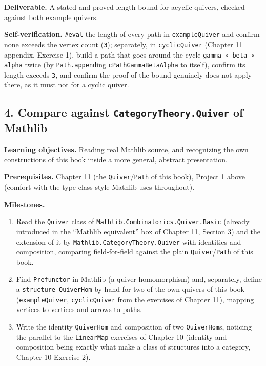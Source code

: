 \textbf{Deliverable.} A stated and proved length bound for acyclic quivers, checked against both example quivers.

\textbf{Self-verification.} \texttt{\#eval} the length of every path in \texttt{exampleQuiver} and confirm none exceeds the vertex count (\texttt{3}); separately, in \texttt{cyclicQuiver} (Chapter 11 appendix, Exercise 1), build a path that goes around the cycle \texttt{gamma ∘ beta ∘ alpha} twice (by \texttt{Path.append}ing \texttt{cPathGammaBetaAlpha} to itself), confirm its length exceeds \texttt{3}, and confirm the proof of the bound genuinely does not apply there, as it must not for a cyclic quiver.

\subsection{\texorpdfstring{4. Compare against \texttt{CategoryTheory.Quiver} of Mathlib}{4. Compare against CategoryTheory.Quiver of Mathlib}}\label{sec:13-next-steps:03-next-projects:5}

\textbf{Learning objectives.} Reading real Mathlib source, and recognizing the own constructions of this book inside a more general, abstract presentation.

\textbf{Prerequisites.} Chapter 11 (the \texttt{Quiver}/\texttt{Path} of this book), Project 1 above (comfort with the type-class style Mathlib uses throughout).

\textbf{Milestones.}

\begin{enumerate}
\def\labelenumi{\arabic{enumi}.}
\tightlist
\item
  Read the \texttt{Quiver} class of \texttt{Mathlib.Combinatorics.Quiver.Basic} (already introduced in the ``Mathlib equivalent'' box of Chapter 11, Section 3) and the extension of it by \texttt{Mathlib.CategoryTheory.Quiver} with identities and composition, comparing field-for-field against the plain \texttt{Quiver}/\texttt{Path} of this book.
\item
  Find \texttt{Prefunctor} in Mathlib (a quiver homomorphism) and, separately, define a \texttt{structure QuiverHom} by hand for two of the own quivers of this book (\texttt{exampleQuiver}, \texttt{cyclicQuiver} from the exercises of Chapter 11), mapping vertices to vertices and arrows to paths.
\item
  Write the identity \texttt{QuiverHom} and composition of two \texttt{QuiverHom}s, noticing the parallel to the \texttt{LinearMap} exercises of Chapter 10 (identity and composition being exactly what make a class of structures into a category, Chapter 10 Exercise 2).
\end{enumerate}

